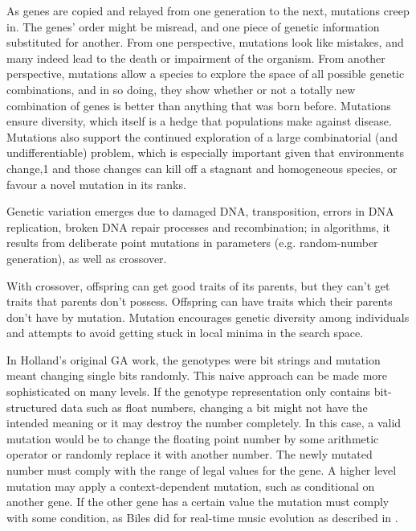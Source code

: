 
As genes are copied and relayed from one generation to the next, mutations creep in. The genes’ order might be misread, and one piece of genetic information substituted for another. From one perspective, mutations look like mistakes, and many indeed lead to the death or impairment of the organism. From another perspective, mutations allow a species to explore the space of all possible genetic combinations, and in so doing, they show whether or not a totally new combination of genes is better than anything that was born before. Mutations ensure diversity, which itself is a hedge that populations make against disease. Mutations also support the continued exploration of a large combinatorial (and undifferentiable) problem, which is especially important given that environments change,1 and those changes can kill off a stagnant and homogeneous species, or favour a novel mutation in its ranks.

Genetic variation emerges due to damaged DNA, transposition, errors in DNA replication, broken DNA repair processes and recombination; in algorithms, it results from deliberate point mutations in parameters (e.g. random-number generation), as well as crossover.

With crossover, offspring can get good traits of its parents, but they can't get traits that parents don't possess.
Offspring can have traits which their parents don't have by mutation.  Mutation encourages genetic diversity among individuals and
attempts to avoid getting stuck in local minima in the search space.

In Holland's original GA work, the genotypes were bit strings and mutation meant changing single bits randomly. 
This naive approach can be made more sophisticated on many levels.
 If the genotype representation only contains bit-structured data such as float numbers, changing a bit might not have the intended meaning or it may destroy the number completely.  In this case, a valid mutation would be to change the floating point number by some arithmetic operator or randomly replace it with another number. The newly mutated number must comply with the range of legal values for the gene.
 A higher level mutation may apply a context-dependent mutation, such as conditional on another gene.  If the other gene has a certain value the mutation must comply with some condition, as Biles did for real-time music evolution as described in \cite{Bilesb2007}.

